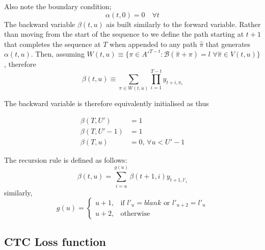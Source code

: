 Also note the boundary condition;
\begin{equation}
\alpha(t, 0) = 0 \quad \forall t
\label{eqn_c3_ctc08}
\end{equation}
The backward variable $\beta(t,u)$ ais built similarly to the forward variable. Rather than moving from the start of the sequence to  we define the path starting at $t + 1$ that completes the sequence at $T$ when appended to any path $\hat{\pi}$ that generates $\alpha(t,u)$. Then, assuming $W(t,u) \equiv \{ \pi \in A'^{T-t} : \mathcal{B}(\hat{\pi} + \pi) = l \, \, \forall \hat{\pi} \in V(t,u) \}$, therefore
\begin{equation}
\beta(t,u) \equiv \sum_{\pi \in W(t,u)} \prod_{i=1}^{T - t} y_{t + i,\pi_i} \label{eqn_c3_ctc08}\end{equation}

The backward variable is therefore equivalently initialised as thus

\begin{equation} \begin{aligned}
\beta(T, U') &= 1 \\
\beta(T, U' - 1) &= 1 \\
\beta(T, u) &= 0, \, \forall u < U' - 1
\end{aligned}\label{eqn_c3_ctc09}\end{equation}

The recursion rule is defined as follows:
\begin{equation}
\beta(t, u) = \sum_{i = u}^{g(u)} \beta(t+1, i) y_{t+1, l'_i}\label{eqn_c3_ctc10}\end{equation}
similarly,
\begin{equation}
g(u) = \begin{cases} u + 1,& \text{if } l'_u = blank \text{ or } l'_{u+2} = l'_{u} \\ u + 2,& \text{otherwise} \end{cases}   
\end{equation}

\subsection{CTC Loss function}

